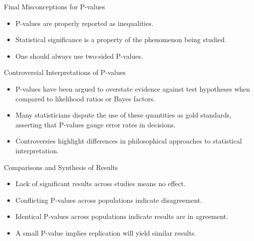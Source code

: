 \documentclass[aspectratio=169, 12pt]{beamer}
\begin{document}
\begin{frame}{Final Misconceptions for P-values} %
\begin{itemize}
    \item P-values are properly reported as inequalities.
    \vspace{0.5cm}
    \item Statistical significance is a property of the phenomenon being studied.
    \vspace{0.5cm}
    \item One should always use two-sided P-values.
\end{itemize}
\end{frame}

\begin{frame}{Controversial Interpretations of P-values}
\begin{itemize}
    \item P-values have been argued to overstate evidence against test hypotheses when compared to likelihood ratios or Bayes factors.
    \vspace{0.5cm}
    \item Many statisticians dispute the use of these quantities as gold standards, asserting that P-values gauge error rates in decisions.
    \vspace{0.5cm}
    \item Controversies highlight differences in philosophical approaches to statistical interpretation.
\end{itemize}
\end{frame}

\begin{frame}{Comparisons and Synthesis of Results} %
\begin{itemize}
    \item Lack of significant results across studies means no effect.
    \vspace{0.5cm}
    \item Conflicting P-values across populations indicate disagreement.
    \vspace{0.5cm}
    \item Identical P-values across populations indicate results are in agreement.
    \vspace{0.5cm}
    \item A small P-value implies replication will yield similar results.
\end{itemize}
\end{frame}
\end{document}
